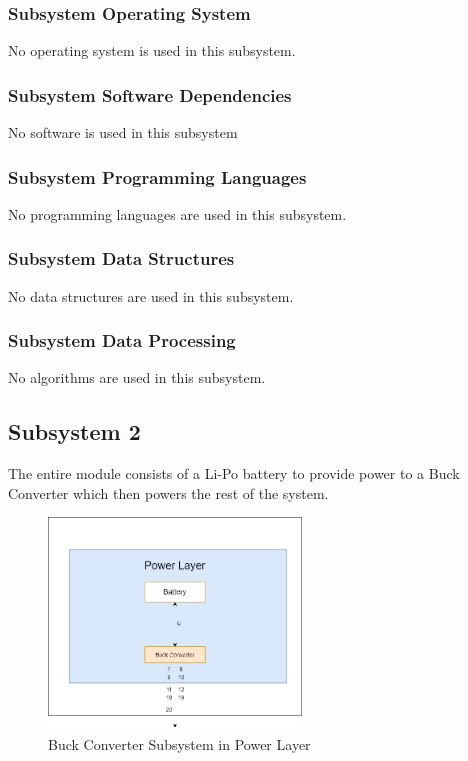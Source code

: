 \subsubsection{Subsystem Operating System}
No operating system is used in this subsystem.

\subsubsection{Subsystem Software Dependencies}
No software is used in this subsystem

\subsubsection{Subsystem Programming Languages}
No programming languages are used in this subsystem.

\subsubsection{Subsystem Data Structures}
No data structures are used in this subsystem.

\subsubsection{Subsystem Data Processing}
No algorithms are used in this subsystem.

\subsection{Subsystem 2}
The entire module consists of a Li-Po battery to provide power to a Buck Converter which then powers the rest of the system. 

\begin{figure}[h!]
	\centering
 	\includegraphics[width=0.60\textwidth]{images/Buck.png} %
 \caption{Buck Converter Subsystem in Power Layer} %
\end{figure}

